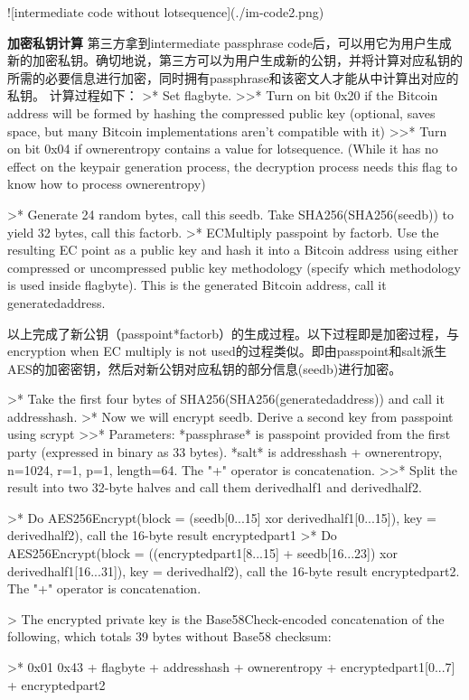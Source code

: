 \documentclass{article}
\begin{document}
![intermediate code without lotsequence](./im-code2.png)

\textbf{加密私钥计算}
第三方拿到intermediate passphrase code后，可以用它为用户生成新的加密私钥。确切地说，第三方可以为用户生成新的公钥，并将计算对应私钥的所需的必要信息进行加密，同时拥有passphrase和该密文人才能从中计算出对应的私钥。  
计算过程如下：
>* Set flagbyte.      
>>* Turn on bit 0x20 if the Bitcoin address will be formed by hashing the compressed public key (optional, saves space, but many Bitcoin implementations aren't compatible with it)
>>* Turn on bit 0x04 if ownerentropy contains a value for lotsequence. (While it has no effect on the keypair generation process, the decryption process needs this flag to know how to process ownerentropy)  

>* Generate 24 random bytes, call this seedb. Take SHA256(SHA256(seedb)) to yield 32 bytes, call this factorb.
>* ECMultiply passpoint by factorb. Use the resulting EC point as a public key and hash it into a Bitcoin address using either compressed or uncompressed public key methodology (specify which methodology is used inside flagbyte). This is the generated Bitcoin address, call it generatedaddress.

以上完成了新公钥（passpoint*factorb）的生成过程。以下过程即是加密过程，与encryption when EC multiply is not used的过程类似。即由passpoint和salt派生AES的加密密钥，然后对新公钥对应私钥的部分信息(seedb)进行加密。

>* Take the first four bytes of SHA256(SHA256(generatedaddress)) and call it addresshash.
>* Now we will encrypt seedb. Derive a second key from passpoint using scrypt  
>>* Parameters: *passphrase* is passpoint provided from the first party (expressed in binary as 33 bytes). *salt* is addresshash + ownerentropy, n=1024, r=1, p=1, length=64. The "+" operator is concatenation.
>>* Split the result into two 32-byte halves and call them derivedhalf1 and derivedhalf2.


>* Do AES256Encrypt(block = (seedb[0...15] xor derivedhalf1[0...15]), key = derivedhalf2), call the 16-byte result encryptedpart1
>* Do AES256Encrypt(block = ((encryptedpart1[8...15] + seedb[16...23]) xor derivedhalf1[16...31]), key = derivedhalf2), call the 16-byte result encryptedpart2. The "+" operator is concatenation.

> The encrypted private key is the Base58Check-encoded concatenation of the following, which totals 39 bytes without Base58 checksum:    

>* 0x01 0x43 + flagbyte + addresshash + ownerentropy +  encryptedpart1[0...7] + encryptedpart2
\end{document}
